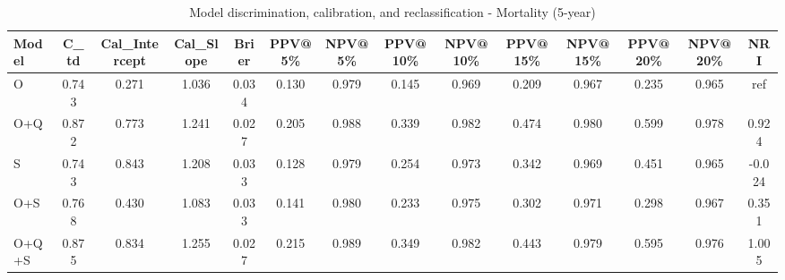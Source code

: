 \begin{table}[htbp]
\centering
\small
\caption{Model discrimination, calibration, and reclassification - Mortality (5-year)}
\label{tab:perf_mortality_5y}
\begin{tabular}{lccccccccccccc}
\toprule
Model & C\_td & Cal\_Intercept & Cal\_Slope & Brier & PPV@5\% & NPV@5\% & PPV@10\% & NPV@10\% & PPV@15\% & NPV@15\% & PPV@20\% & NPV@20\% & NRI \\
\midrule
O & 0.743 & 0.271 & 1.036 & 0.034 & 0.130 & 0.979 & 0.145 & 0.969 & 0.209 & 0.967 & 0.235 & 0.965 & ref \\
O+Q & 0.872 & 0.773 & 1.241 & 0.027 & 0.205 & 0.988 & 0.339 & 0.982 & 0.474 & 0.980 & 0.599 & 0.978 & 0.924 \\
S & 0.743 & 0.843 & 1.208 & 0.033 & 0.128 & 0.979 & 0.254 & 0.973 & 0.342 & 0.969 & 0.451 & 0.965 & -0.024 \\
O+S & 0.768 & 0.430 & 1.083 & 0.033 & 0.141 & 0.980 & 0.233 & 0.975 & 0.302 & 0.971 & 0.298 & 0.967 & 0.351 \\
O+Q+S & 0.875 & 0.834 & 1.255 & 0.027 & 0.215 & 0.989 & 0.349 & 0.982 & 0.443 & 0.979 & 0.595 & 0.976 & 1.005 \\
\bottomrule
\end{tabular}
\end{table}